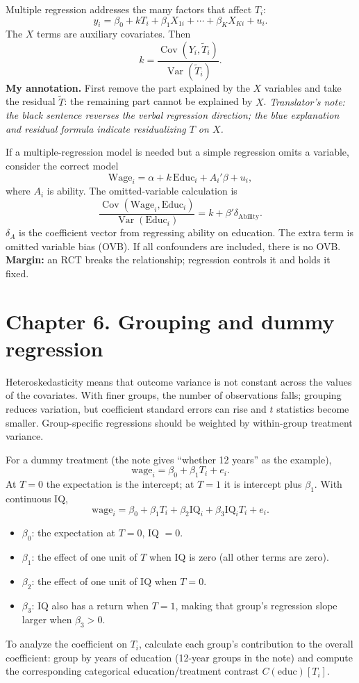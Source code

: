 Multiple regression addresses the many factors that affect $T_i$:
\[y_i=\beta_0+kT_i+\beta_1X_{1i}+\cdots+\beta_KX_{Ki}+u_i.\]
The $X$ terms are auxiliary covariates. Then
\[k=\frac{\operatorname{Cov}(Y_i,\widetilde T_i)}{\operatorname{Var}(\widetilde T_i)}.\]
\textbf{My annotation.} First remove the part explained by the $X$ variables and take the residual $\widetilde T$: the remaining part cannot be explained by $X$. \textit{Translator's note: the black sentence reverses the verbal regression direction; the blue explanation and residual formula indicate residualizing $T$ on $X$.}

If a multiple-regression model is needed but a simple regression omits a variable, consider the correct model
\[\mathrm{Wage}_i=\alpha+k\,\mathrm{Educ}_i+A_i'\beta+u_i,\]
where $A_i$ is ability. The omitted-variable calculation is
\[\frac{\operatorname{Cov}(\mathrm{Wage}_i,\mathrm{Educ}_i)}{\operatorname{Var}(\mathrm{Educ}_i)}=k+\beta'\delta_{\mathrm{Ability}}.\]
$\delta_A$ is the coefficient vector from regressing ability on education. The extra term is omitted variable bias (OVB). If all confounders are included, there is no OVB. \textbf{Margin:} an RCT breaks the relationship; regression controls it and holds it fixed.

\section{Chapter 6. Grouping and dummy regression}
Heteroskedasticity means that outcome variance is not constant across the values of the covariates. With finer groups, the number of observations falls; grouping reduces variation, but coefficient standard errors can rise and $t$ statistics become smaller. Group-specific regressions should be weighted by within-group treatment variance.

For a dummy treatment (the note gives ``whether 12 years'' as the example),
\[\mathrm{wage}_i=\beta_0+\beta_1T_i+e_i.\]
At $T=0$ the expectation is the intercept; at $T=1$ it is intercept plus $\beta_1$. With continuous IQ,
\[\mathrm{wage}_i=\beta_0+\beta_1T_i+\beta_2\mathrm{IQ}_i+\beta_3\mathrm{IQ}_iT_i+e_i.\]
\begin{itemize}
\item $\beta_0$: the expectation at $T=0$, IQ $=0$.
\item $\beta_1$: the effect of one unit of $T$ when IQ is zero (all other terms are zero).
\item $\beta_2$: the effect of one unit of IQ when $T=0$.
\item $\beta_3$: IQ also has a return when $T=1$, making that group's regression slope larger when $\beta_3>0$.
\end{itemize}
To analyze the coefficient on $T_i$, calculate each group's contribution to the overall coefficient: group by years of education (12-year groups in the note) and compute the corresponding categorical education/treatment contrast $C(\mathrm{educ})[T_i]$.

